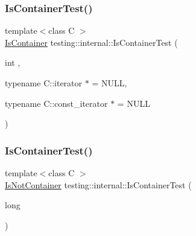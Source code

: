 \mbox{\label{namespacetesting_1_1internal_acb6ea1086293c1d6636e3c67941351fb}} 
\subsubsection{\texorpdfstring{IsContainerTest()}{IsContainerTest()}\hspace{0.1cm}{\footnotesize\ttfamily [1/2]}}
{\footnotesize\ttfamily template$<$class C $>$ \\
\mbox{\hyperlink{namespacetesting_1_1internal_ad8f0c2883245f1df2a53618a49f0deb3}{Is\+Container}} testing\+::internal\+::\+Is\+Container\+Test (\begin{DoxyParamCaption}\item[{int}]{,  }\item[{typename C\+::iterator $\ast$}]{ = {\ttfamily NULL},  }\item[{typename C\+::const\+\_\+iterator $\ast$}]{ = {\ttfamily NULL} }\end{DoxyParamCaption})}

\mbox{\label{namespacetesting_1_1internal_af545a2ae928b8a9e7581978234464275}} 
\subsubsection{\texorpdfstring{IsContainerTest()}{IsContainerTest()}\hspace{0.1cm}{\footnotesize\ttfamily [2/2]}}
{\footnotesize\ttfamily template$<$class C $>$ \\
\mbox{\hyperlink{namespacetesting_1_1internal_abf080521ce135deb510e0a7830fd3d33}{Is\+Not\+Container}} testing\+::internal\+::\+Is\+Container\+Test (\begin{DoxyParamCaption}\item[{long}]{ }\end{DoxyParamCaption})}

\mbox{\label{namespacetesting_1_1internal_a4bd96b7fa6486802d33ddc217af55a39}} 
